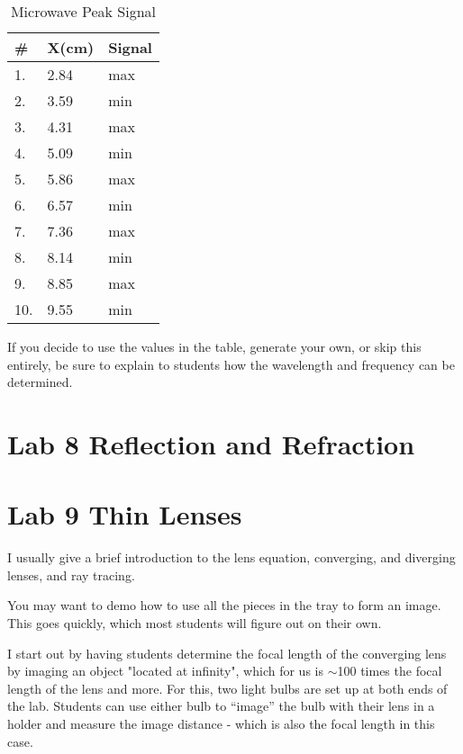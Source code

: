 \begin{table}[htbp]
\begin{minipage}{0.4\textwidth} 
\centering
\caption{Microwave Peak Signal} \label{t:microwavepeaks}
\begin{tabular}{l l l}\toprule
\# & X(cm) & Signal\\
\midrule
1.	&	2.84 &	max\\
2.	&	3.59 &	min\\
3.	&	4.31	 &	max	\\
4.	&	5.09 &	min\\
5.	&	5.86 &	max\\
6.	&	6.57	 &	min\\
7.	&	7.36 &	max\\
8.	&	8.14 &	min\\
9.	&	8.85 &	max\\
10.	& 	9.55 &	min\\
\bottomrule
\end{tabular}
\end{minipage} \hfill
\begin{minipage}{0.5\textwidth} 
	If you decide to use the values in the table, generate your own, or skip this entirely, be sure to explain to students how the wavelength and frequency can be determined.
\end{minipage}
\end{table}

\section{Lab 8 Reflection and Refraction}

\section{Lab 9 Thin Lenses}
I usually give a brief introduction to the lens equation, converging, and diverging lenses, and ray tracing.

You may want to demo how to use all the pieces in the tray to form an image. This goes quickly, which most students will figure out on their own.

I start out by having students determine the focal length of the converging lens by imaging an object "located at infinity", which for us is $\sim$100 times the focal length of the lens and more. For this, two light bulbs are set up at both ends of the lab. Students can use either bulb to ``image'' the bulb with their lens in a holder and measure the image distance - which is also the focal length in this case. 

